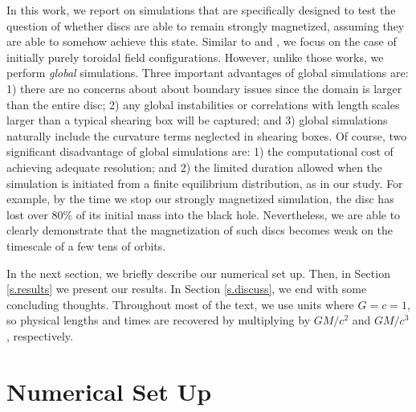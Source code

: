 \documentclass[useAMS,usenatbib]{mn2e}
\begin{document}
In this work, we report on simulations that are specifically designed to test the question of whether discs are able to remain strongly magnetized, assuming they are able to somehow achieve this state.  Similar to \citet{Johansen08} and \citet{Salvesen16}, we focus on the case of initially purely toroidal field configurations.  However, unlike those works, we perform {\em global} simulations.  Three important advantages of global simulations are: 1) there are no concerns about about boundary issues since the domain is larger than the entire disc; 2) any global instabilities or correlations with length scales larger than a typical shearing box will be captured; and 3) global simulations naturally include the curvature terms neglected in shearing boxes.  Of course, two significant disadvantage of global simulations are: 1) the computational cost of achieving adequate resolution; and 2) the limited duration allowed when the simulation is initiated from a finite equilibrium distribution, as in our study.  For example, by the time we stop our strongly magnetized simulation, the disc has lost over 80\% of its initial mass into the black hole.  Nevertheless, we are able to clearly demonstrate that the magnetization of such discs becomes weak on the timescale of a few tens of orbits.

In the next section, we briefly describe our numerical set up.  Then, in Section \ref{s.results} we present our results.  In Section \ref{s.discuss}, we end with some concluding thoughts.  Throughout most of the text, we use units where $G=c=1$, so physical lengths and times are recovered by multiplying by $GM/c^2$ and $GM/c^3$, respectively.



\section{Numerical Set Up}
\label{s.setup}
\end{document}
